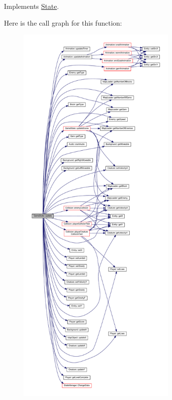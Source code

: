 Implements \hyperlink{class_state_a770f40188fdfc64bc95a5166fef12e02}{State}.



Here is the call graph for this function\+:
\nopagebreak
\begin{figure}[H]
\begin{center}
\leavevmode
\includegraphics[height=550pt]{class_game_state_a2ea32b0cd5f747ef6223d182f415a6c4_cgraph}
\end{center}
\end{figure}


